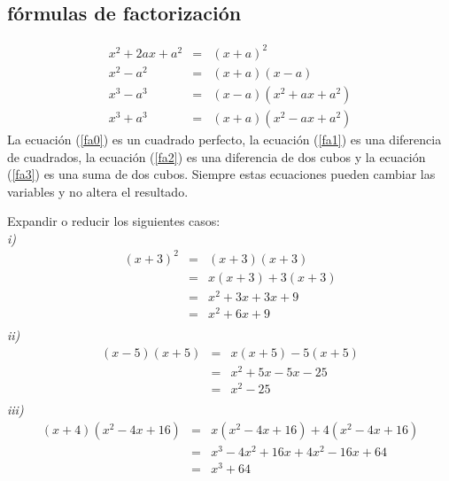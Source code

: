 \subsection{fórmulas de factorización}
\label{facto}
\begin{eqnarray}
 x^{2}+2ax+a^{2}&=&(x+a)^{2} \label{fa0}\\
 x^{2}-a^{2}&=&(x+a)(x-a) \label{fa1}\\
 x^{3}-a^{3}&=&(x-a)(x^{2}+ax+a^{2})\label{fa2} \\
x^{3}+a^{3} &=& (x+a)(x^{2}-ax+a^{2}) \label{fa3}
\end{eqnarray}
La ecuación (\ref{fa0}) es un cuadrado perfecto, la ecuación (\ref{fa1}) es una diferencia de cuadrados, la ecuación (\ref{fa2}) es una diferencia de dos cubos y la ecuación (\ref{fa3}) es una suma de dos cubos. Siempre estas ecuaciones pueden cambiar las variables y no altera el resultado.

\begin{myexample}
Expandir o reducir los siguientes casos:\\
\noindent\textit{i)}
\begin{eqnarray*}
(x+3)^{2} &=& (x+3)(x+3)\nonumber \\
&=& x(x+3)+3(x+3) \nonumber \\
&=& x^{2}+3x+3x+9 \nonumber \\
&=& x^{2}+6x+9 \nonumber \\
\end{eqnarray*}
\noindent\textit{ii)}
\begin{eqnarray*}
(x-5)(x+5) &=& x(x+5)-5(x+5)\nonumber \\
&=& x^{2}+5x-5x-25 \nonumber \\
&=& x^{2}-25\nonumber \\
\end{eqnarray*}
\noindent\textit{iii)}
\begin{eqnarray*}
(x+4)(x^{2}-4x+16) &=&  x(x^{2}-4x+16)+4(x^{2}-4x+16) \nonumber \\
&=& x^{3}-4x^{2}+16x+4x^{2}-16x+64  \nonumber \\
&=& x^{3}+64  \nonumber \\
\end{eqnarray*}
\end{myexample}


